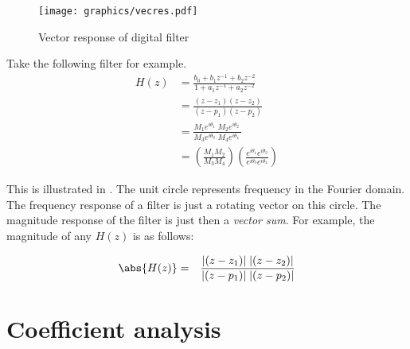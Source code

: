 \begin{figure}[ht]
  \centering%
  \texttt{[image: graphics/vecres.pdf]}
  \caption{
     Vector response of digital filter 
     \label{fig:zchar_vector}
     }
\end{figure}
\begin{example}
\label{ex:zchar_vector}
Take the following filter for example.
\begin{align*}
   H(z) &= \frac{b_0 + b_1z^{-1} + b_2z^{-2} }
                {1   + a_1z^{-1} + a_2z^{-2} }
   \\   &= \frac{(z-z_1)(z-z_2)}
                {(z-p_1)(z-p_2)}
   \\   &= \frac{M_1e^{i\theta_1} \; M_2e^{i\theta_2} \; }
                {M_3e^{i\theta_3} \; M_4e^{i\theta_4} \; }
   \\   &= \left(\frac{M_1M_2}{M_3M_4} \right)
           \left(\frac{e^{i\theta_1} e^{i\theta_2} }
                      {e^{i\theta_3} e^{i\theta_4} }\right)
\end{align*}

This is illustrated in .
The unit circle represents frequency in the Fourier domain.
The frequency response of a filter is just a rotating vector on this circle.
The magnitude response of the filter is just then a {\em vector sum}.
For example, the magnitude of any $H(z)$ is as follows:

\begin{align*}
   \abs{H(z)} &=& \frac{|(z-z_1)|\;|(z-z_2)|}
                 {|(z-p_1)|\;|(z-p_2)|}
\end{align*}
\end{example}

\section{Coefficient analysis}
\begin{lemma}
\label{lem:aacos}
\end{lemma}


